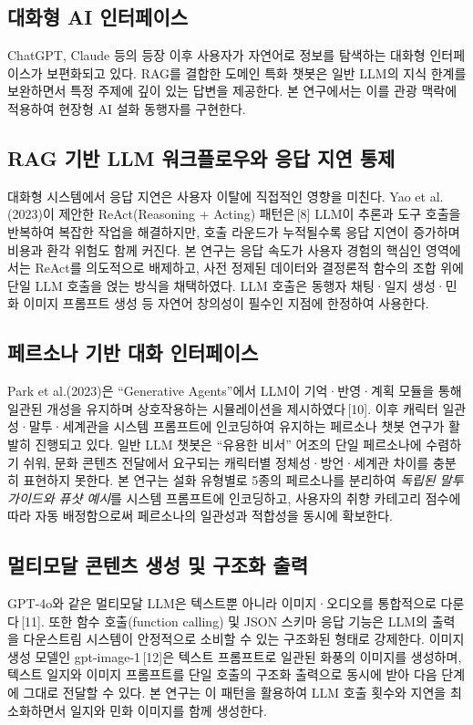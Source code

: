 \documentclass[10pt,twocolumn,a4paper]{article}
\begin{document}
\subsection{대화형 AI 인터페이스}

ChatGPT, Claude 등의 등장 이후 사용자가 자연어로 정보를 탐색하는 대화형
인터페이스가 보편화되고 있다. RAG를 결합한 도메인 특화 챗봇은 일반 LLM의
지식 한계를 보완하면서 특정 주제에 깊이 있는 답변을 제공한다. 본 연구에서는
이를 관광 맥락에 적용하여 현장형 AI 설화 동행자를 구현한다.

\subsection{RAG 기반 LLM 워크플로우와 응답 지연 통제}

대화형 시스템에서 응답 지연은 사용자 이탈에 직접적인 영향을 미친다. Yao et
al.(2023)이 제안한 ReAct(Reasoning + Acting) 패턴은\,[8] LLM이 추론과 도구
호출을 반복하여 복잡한 작업을 해결하지만, 호출 라운드가 누적될수록 응답
지연이 증가하며 비용과 환각 위험도 함께 커진다. 본 연구는 응답 속도가 사용자
경험의 핵심인 영역에서는 ReAct를 의도적으로 배제하고, 사전 정제된 데이터와
결정론적 함수의 조합 위에 단일 LLM 호출을 얹는 방식을 채택하였다. LLM 호출은
동행자 채팅·일지 생성·민화 이미지 프롬프트 생성 등 자연어 창의성이 필수인
지점에 한정하여 사용한다.

\subsection{페르소나 기반 대화 인터페이스}

Park et al.(2023)은 ``Generative Agents''에서 LLM이 기억·반영·계획 모듈을
통해 일관된 개성을 유지하며 상호작용하는 시뮬레이션을 제시하였다\,[10].
이후 캐릭터 일관성·말투·세계관을 시스템 프롬프트에 인코딩하여 유지하는
페르소나 챗봇 연구가 활발히 진행되고 있다. 일반 LLM 챗봇은 ``유용한 비서''
어조의 단일 페르소나에 수렴하기 쉬워, 문화 콘텐츠 전달에서 요구되는
캐릭터별 정체성·방언·세계관 차이를 충분히 표현하지 못한다. 본 연구는
설화 유형별로 5종의 페르소나를 분리하여 \emph{독립된 말투 가이드와 퓨샷
예시}를 시스템 프롬프트에 인코딩하고, 사용자의 취향 카테고리 점수에 따라
자동 배정함으로써 페르소나의 일관성과 적합성을 동시에 확보한다.

\subsection{멀티모달 콘텐츠 생성 및 구조화 출력}

GPT-4o와 같은 멀티모달 LLM은 텍스트뿐 아니라 이미지·오디오를 통합적으로
다룬다\,[11]. 또한 함수 호출(function calling) 및 JSON 스키마 응답
기능은 LLM의 출력을 다운스트림 시스템이 안정적으로 소비할 수 있는 구조화된
형태로 강제한다. 이미지 생성 모델인 gpt-image-1\,[12]은 텍스트 프롬프트로
일관된 화풍의 이미지를 생성하며, 텍스트 일지와 이미지 프롬프트를 단일 호출의
구조화 출력으로 동시에 받아 다음 단계에 그대로 전달할 수 있다. 본 연구는
이 패턴을 활용하여 LLM 호출 횟수와 지연을 최소화하면서 일지와 민화 이미지를
함께 생성한다.
\end{document}
